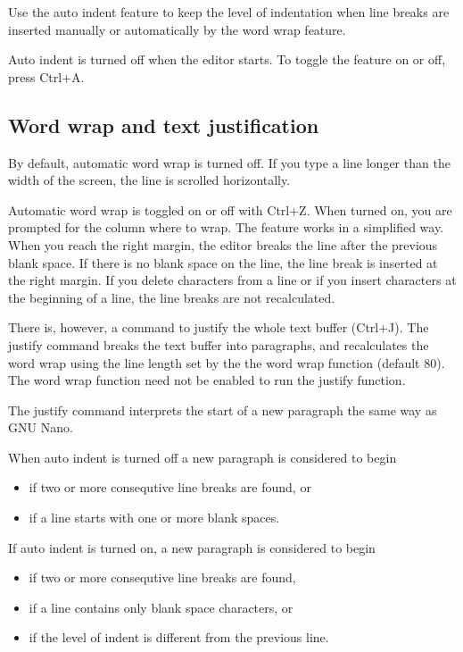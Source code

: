 \documentclass{article}
\begin{document}
        Use the auto indent feature to keep the level of indentation when line breaks are inserted manually or automatically by
        the word wrap feature.

        Auto indent is turned off when the editor starts. To toggle the feature on or off, press Ctrl+A.
    
    \subsection{Word wrap and text justification}
    \label{wordwrap}

        By default, automatic word wrap is turned off. If you type a line longer than the width of the screen, the line
        is scrolled horizontally.

        Automatic word wrap is toggled on or off with Ctrl+Z. When turned on, you are prompted for the column where
        to wrap. The feature works in a simplified way. When you reach the right margin, the editor breaks the
        line after the previous blank space. If there is no blank space on the line, the line break is inserted
        at the right margin. If you delete characters from a line or if you insert characters at the beginning of a line,
        the line breaks are not recalculated.

        There is, however, a command to justify the whole text buffer (Ctrl+J). The justify command breaks the text buffer into
        paragraphs, and recalculates the word wrap using the line length set by the the word wrap function (default 80). The
        word wrap function need not be enabled to run the justify function.

        The justify command interprets the start of a new paragraph the same way as GNU Nano. 
        
        When auto indent is turned off a new paragraph is considered to begin

        \begin{itemize}
		    \item if two or more consequtive line breaks are found, or
		    \item if a line starts with one or more blank spaces.
	    \end{itemize}

        If auto indent is turned on, a new paragraph is considered to begin

        \begin{itemize}
		    \item if two or more consequtive line breaks are found, 
            \item if a line contains only blank space characters, or
		    \item if the level of indent is different from the previous line.
	    \end{itemize}      
\end{document}
